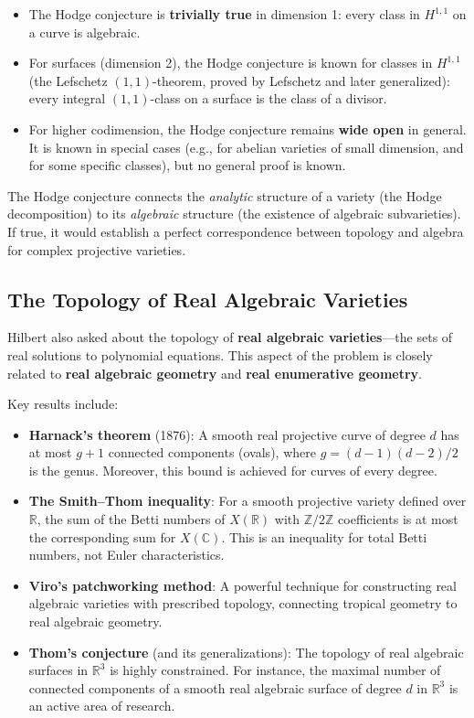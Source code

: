 \begin{itemize}
    \item The Hodge conjecture is \textbf{trivially true} in dimension 1: every class in $H^{1,1}$ on a curve is algebraic.
    \item For surfaces (dimension 2), the Hodge conjecture is known for classes in $H^{1,1}$ (the Lefschetz $(1,1)$-theorem, proved by Lefschetz and later generalized): every integral $(1,1)$-class on a surface is the class of a divisor.
    \item For higher codimension, the Hodge conjecture remains \textbf{wide open} in general. It is known in special cases (e.g., for abelian varieties of small dimension, and for some specific classes), but no general proof is known.
\end{itemize}

The Hodge conjecture connects the \emph{analytic} structure of a variety (the Hodge decomposition) to its \emph{algebraic} structure (the existence of algebraic subvarieties). If true, it would establish a perfect correspondence between topology and algebra for complex projective varieties.

\subsection{The Topology of Real Algebraic Varieties}

Hilbert also asked about the topology of \textbf{real algebraic varieties}---the sets of real solutions to polynomial equations. This aspect of the problem is closely related to \textbf{real algebraic geometry} and \textbf{real enumerative geometry}.

Key results include:

\begin{itemize}
    \item \textbf{Harnack's theorem} (1876): A smooth real projective curve of degree $d$ has at most $g + 1$ connected components (ovals), where $g = (d-1)(d-2)/2$ is the genus. Moreover, this bound is achieved for curves of every degree.

    \item \textbf{The Smith--Thom inequality}: For a smooth projective variety defined over $\mathbb{R}$, the sum of the Betti numbers of $X(\mathbb{R})$ with $\mathbb{Z}/2\mathbb{Z}$ coefficients is at most the corresponding sum for $X(\mathbb{C})$. This is an inequality for total Betti numbers, not Euler characteristics.

    \item \textbf{Viro's patchworking method}: A powerful technique for constructing real algebraic varieties with prescribed topology, connecting tropical geometry to real algebraic geometry.

    \item \textbf{Thom's conjecture} (and its generalizations): The topology of real algebraic surfaces in $\mathbb{R}^3$ is highly constrained. For instance, the maximal number of connected components of a smooth real algebraic surface of degree $d$ in $\mathbb{R}^3$ is an active area of research.
\end{itemize}

